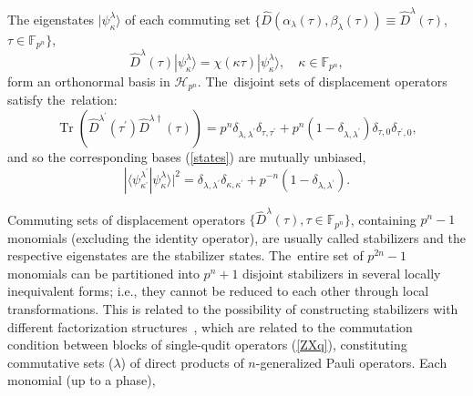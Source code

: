 \documentclass[quantumrep,article,accept,pdftex,moreauthors]{Definitions/mdpi}
\DeclareMathOperator{\Tr}{Tr}
\begin{document}
The eigenstates $|\psi_\kappa^\lambda\rangle$ of each commuting set
$\{\hat{D}\left(\alpha_{\lambda}(\tau),\beta_{\lambda}(\tau)\right) \equiv
\hat{D}^{\lambda}(\tau)$, $\tau \in \mathbb{F}_{p^{n}}\}$,
\begin{equation}
  \hat{D}^{\lambda}(\tau)|\psi_{\kappa}^{\lambda}\rangle
  = \chi(\kappa \tau) |\psi_{\kappa}^{\lambda}\rangle,
  \quad \kappa \in \mathbb{F}_{p^{n}},
  \label{states}
\end{equation}
form an orthonormal basis in $\mathcal{H}_{p^{n}}$. The~disjoint sets of
displacement operators satisfy \mbox{the relation:}
\begin{equation*}
  \Tr\left(
    \hat{D}^{\lambda^{\prime}}(\tau^{\prime})\hat{D}^{\lambda\dagger}(\tau)
  \right)
  = p^{n} \delta_{\lambda,\lambda^{\prime}} \delta_{\tau,\tau^{\prime}}
  + p^{n}(1-\delta_{\lambda,\lambda^{\prime}}) \delta_{\tau,0}
  \delta_{\tau^{\prime},0},
\end{equation*}
and so the corresponding bases (\ref{states}) are mutually unbiased,
\begin{equation}
  |\langle\psi_{\kappa^{\prime}}^{\lambda^{\prime}}
  |\psi_{\kappa}^{\lambda}\rangle|^{2}
  = \delta_{\lambda,\lambda^{\prime}} \delta_{\kappa,\kappa^{\prime}}
  + p^{-n} (1-\delta_{\lambda,\lambda^{\prime}}).
  \label{UB}
\end{equation}

Commuting sets of displacement operators $\{\hat{D}^{\lambda }(\tau), \tau \in
\mathbb{F}_{p^{n}}\}$, containing $p^{n}-1$ monomials (excluding the identity
operator), are usually called stabilizers and the respective eigenstates are the
stabilizer states. The~entire set of $p^{2n}-1$ monomials can be partitioned
into $p^{n}+1$ disjoint stabilizers in several locally inequivalent forms; i.e.,
they cannot be reduced to each other through local transformations. This is
related to the possibility of constructing stabilizers with different
factorization structures~\cite{factor1,factor2}, which are related to the
commutation condition between blocks of single-qudit operators (\ref{ZXq}),
constituting commutative sets ($\lambda$) of direct products of $n$-generalized Pauli operators. Each monomial (up to a phase),
\end{document}
